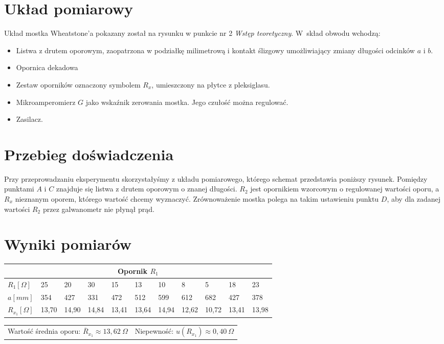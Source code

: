 \documentclass[a4paper,11pt]{article}
\begin{document}
\section{Układ pomiarowy}
Układ mostka Wheatstone’a pokazany został na rysunku w punkcie nr 2 \textit{Wstęp teoretyczny}. W~skład obwodu wchodzą:
\begin{itemize}
\item Listwa z drutem oporowym, zaopatrzona w podziałkę milimetrową i kontakt ślizgowy umożliwiający zmiany długości odcinków $a$ i $b$.
\item  Opornica dekadowa
\item  Zestaw oporników oznaczony symbolem $R_x$, umieszczony na płytce z pleksiglasu.
\item Mikroamperomierz $G$ jako wskaźnik zerowania mostka. Jego czułość można regulować.
\item Zasilacz.
\end{itemize}

\section{Przebieg doświadczenia}
Przy przeprowadzaniu eksperymentu skorzystałyśmy z układu pomiarowego, którego schemat przedstawia poniższy rysunek. Pomiędzy punktami $A$ i $C$ znajduje się listwa z  drutem oporowym o znanej długości. $R_2$ jest opornikiem wzorcowym o regulowanej wartości oporu, a $R_x$ nieznanym oporem, którego wartość chcemy wyznaczyć. Zrównoważenie mostka polega na takim ustawieniu punktu $D$, aby dla zadanej wartości $R_2$ przez galwanometr nie płynął prąd.

\section{Wyniki pomiarów}


\begin{table}[!ht]
\setlength{\extrarowheight}{5pt}
\centering
\begin{tabularx}{\textwidth}{XXXXXXXXXXX}

\multicolumn{11}{c}{\textbf{Opornik $R_1$}}\\        
\hline
$R_1[\Omega]$  & 25 & 20 & 30 & 15 & 13 & 10 & 8 & 5 & 18 & 23 \\
\hline
$a[mm]$  & 354 & 427 & 331 & 472 & 512 & 599 & 612 & 682 & 427 & 378  \\
\hline
$R_{x_1}[\Omega]$ & 13,70 &	14,90 &	14,84 &	13,41 &	13,64 &	14,94 &	12,62 &	10,72 &	13,41 &	13,98
\\    
\hline   
\end{tabularx}
\begin{tabularx}{\textwidth}{XX}
\centering
Wartość średnia oporu: $\overline{R}_{x_1}\approx 13,62~\Omega$ & Niepewność: $u(R_{x_1})\approx 0,40 ~\Omega $\\

\end{tabularx}
\end{table}
\end{document}
